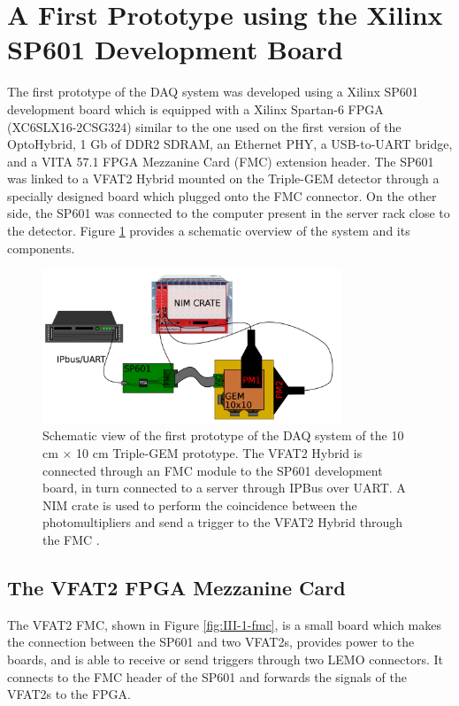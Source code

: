   \section{A First Prototype using the Xilinx SP601 Development Board}
  \label{sec:III-1-sp601}

    The first prototype of the DAQ system was developed using a Xilinx SP601 development board which is equipped with a Xilinx Spartan-6 FPGA (XC6SLX16-2CSG324) similar to the one used on the first version of the OptoHybrid, 1 Gb of DDR2 SDRAM, an Ethernet PHY, a USB-to-UART bridge, and a VITA 57.1 FPGA Mezzanine Card (FMC) extension header. The SP601 was linked to a VFAT2 Hybrid mounted on the Triple-GEM detector through a specially designed board which plugged onto the FMC connector. On the other side, the SP601 was connected to the computer present in the server rack close to the detector. Figure \ref{fig:III-1-sys-1} provides a schematic overview of the system and its components.

    \begin{figure}[t!]
      \centering
      \includegraphics[width=0.8\textwidth]{img/III-1-arch/sys_1.png}
      \caption{Schematic view of the first prototype of the DAQ system of the 10 cm $ \times $ 10 cm Triple-GEM prototype. The VFAT2 Hybrid is connected through an FMC module to the SP601 development board, in turn connected to a server through IPBus over UART. A NIM crate is used to perform the coincidence between the photomultipliers and send a trigger to the VFAT2 Hybrid through the FMC \cite{Leonard:2065693}.}
      \label{fig:III-1-sys-1}
    \end{figure}

    \subsection{The VFAT2 FPGA Mezzanine Card}

      The VFAT2 FMC, shown in Figure \ref{fig:III-1-fmc}, is a small board which makes the connection between the SP601 and two VFAT2s, provides power to the boards, and is able to receive or send triggers through two LEMO connectors. It connects to the FMC header of the SP601 and forwards the signals of the VFAT2s to the FPGA.


